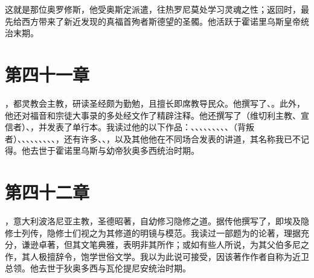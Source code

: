 这就是那位奥罗修斯，他受奥斯定派遣，往热罗尼莫处学习灵魂之性；返回时，最先给西方带来了新近发现的真福首殉者斯德望的圣髑。他活跃于霍诺里乌斯皇帝统治末期。\par


\section{第四十一章}

，都灵教会主教，研读圣经颇为勤勉，且擅长即席教导民众。他撰写了、。此外，他还对福音和宗徒大事录的多处经文作了精辟注释。他还撰写了（维切利主教、宣信者）、，并发表了单行本。我读过他的以下作品：、、、、、、、、、（背叛者）、、、、、、、、、，还有许多、、，以及其他他在不同场合发表的讲道，其名称我已不记得。他去世于霍诺里乌斯与幼帝狄奥多西统治时期。\par


\section{第四十二章}

，意大利波洛尼亚主教，圣德昭著，自幼修习隐修之道。据传他撰写了，即埃及隐修士列传，隐修士们视之为其修道的明镜与模范。我读过一部题为的论著，理据充分，谦逊卓著，但其文笔典雅，表明非其所作；或如有些人所说，为其父伯多尼之作，其人极擅辞令，饱学世俗文学。我以为此说可接受，因该著作作者自称为近卫总领。他去世于狄奥多西与瓦伦提尼安统治时期。\par


